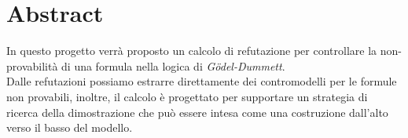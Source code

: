 \documentclass[\main/tesi.tex]{subfiles}
\begin{document}
\chapter{Abstract}

In questo progetto verrà proposto un calcolo di refutazione per controllare la non-provabilità di una formula nella logica di \textit{G\"odel-Dummett}. \\
Dalle refutazioni possiamo estrarre direttamente dei contromodelli per le formule non provabili, inoltre, il calcolo è progettato per supportare un strategia di ricerca della dimostrazione che può essere intesa come una costruzione dall'alto verso il basso del modello. \\
\end{document}
